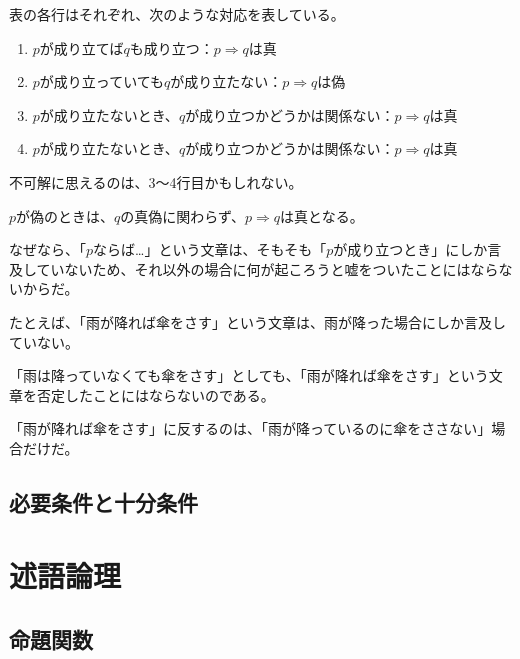 \documentclass[../../imaging-math]{subfiles}
\begin{document}
表の各行はそれぞれ、次のような対応を表している。

\begin{enumerate}
  \item $p$が成り立てば$q$も成り立つ：$p \Rightarrow q$は真
  \item $p$が成り立っていても$q$が成り立たない：$p \Rightarrow q$は偽
  \item $p$が成り立たないとき、$q$が成り立つかどうかは関係ない：$p \Rightarrow q$は真
  \item $p$が成り立たないとき、$q$が成り立つかどうかは関係ない：$p \Rightarrow q$は真
\end{enumerate}

不可解に思えるのは、3〜4行目かもしれない。

$p$が偽のときは、$q$の真偽に関わらず、$p \Rightarrow q$は真となる。

なぜなら、「$p$ならば…」という文章は、そもそも「$p$が成り立つとき」にしか言及していないため、それ以外の場合に何が起ころうと嘘をついたことにはならないからだ。

\br

たとえば、「雨が降れば傘をさす」という文章は、雨が降った場合にしか言及していない。

「雨は降っていなくても傘をさす」としても、「雨が降れば傘をさす」という文章を否定したことにはならないのである。

「雨が降れば傘をさす」に反するのは、「雨が降っているのに傘をささない」場合だけだ。

\subsection{必要条件と十分条件}

\section{述語論理}

\subsection{命題関数}
\end{document}
